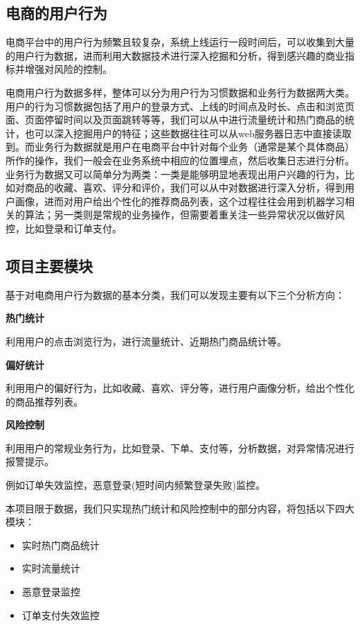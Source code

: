 \documentclass[oneside]{ctexbook}
\begin{document}
\subsection{电商的用户行为}

电商平台中的用户行为频繁且较复杂，系统上线运行一段时间后，可以收集到大量的用户行为数据，进而利用大数据技术进行深入挖掘和分析，得到感兴趣的商业指标并增强对风险的控制。

电商用户行为数据多样，整体可以分为用户行为习惯数据和业务行为数据两大类。用户的行为习惯数据包括了用户的登录方式、上线的时间点及时长、点击和浏览页面、页面停留时间以及页面跳转等等，我们可以从中进行流量统计和热门商品的统计，也可以深入挖掘用户的特征；这些数据往往可以从web服务器日志中直接读取到。而业务行为数据就是用户在电商平台中针对每个业务（通常是某个具体商品）所作的操作，我们一般会在业务系统中相应的位置埋点，然后收集日志进行分析。业务行为数据又可以简单分为两类：一类是能够明显地表现出用户兴趣的行为，比如对商品的收藏、喜欢、评分和评价，我们可以从中对数据进行深入分析，得到用户画像，进而对用户给出个性化的推荐商品列表，这个过程往往会用到机器学习相关的算法；另一类则是常规的业务操作，但需要着重关注一些异常状况以做好风控，比如登录和订单支付。

\subsection{项目主要模块}

基于对电商用户行为数据的基本分类，我们可以发现主要有以下三个分析方向：

\textbf{热门统计}

利用用户的点击浏览行为，进行流量统计、近期热门商品统计等。

\textbf{偏好统计}

利用用户的偏好行为，比如收藏、喜欢、评分等，进行用户画像分析，给出个性化的商品推荐列表。

\textbf{风险控制}

利用用户的常规业务行为，比如登录、下单、支付等，分析数据，对异常情况进行报警提示。

例如订单失效监控，恶意登录(短时间内频繁登录失败)监控。

本项目限于数据，我们只实现热门统计和风险控制中的部分内容，将包括以下四大模块：

\begin{itemize}
\item 实时热门商品统计
\item 实时流量统计
\item 恶意登录监控
\item 订单支付失效监控
\end{itemize}
\end{document}
